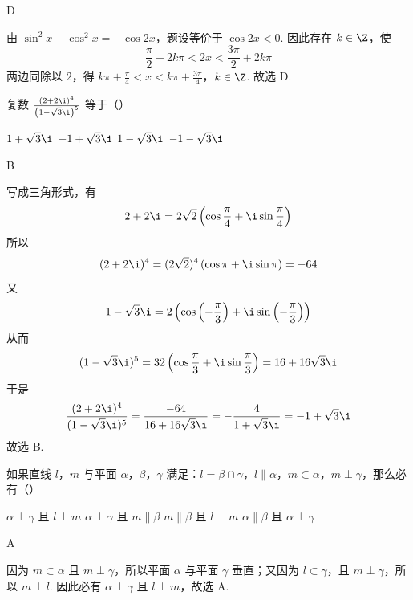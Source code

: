 \begin{answer}
D
\end{answer}

\begin{solution}
由 \(\sin^2x-\cos^2x=-\cos2x\)，题设等价于 \(\cos2x<0\). 因此存在 \(k\in\Z\)，使
\[
\frac{\pi}{2}+2k\pi<2x<\frac{3\pi}{2}+2k\pi
\]
两边同除以 \(2\)，得
\(k\pi+\frac{\pi}{4}<x<k\pi+\frac{3\pi}{4}\)，\(k\in\Z\).
故选 D.
\end{solution}

\begin{problem}
复数 \(\frac{(2 + 2\i)^4}{\left(1 - \sqrt{3}\i\right)^5}\) 等于（\quad）

\choices
    {\(1 + \sqrt{3}\i\)}
    {\(-1 + \sqrt{3}\i\)}
    {\(1 - \sqrt{3}\i\)}
    {\(-1 - \sqrt{3}\i\)}
\end{problem}

\begin{answer}
B
\end{answer}

\begin{solution}
写成三角形式，有
\[
2+2\i=2\sqrt2\left(\cos\frac{\pi}{4}+\i\sin\frac{\pi}{4}\right)
\]
所以
\[
(2+2\i)^4=(2\sqrt2)^4\left(\cos\pi+\i\sin\pi\right)=-64
\]
又
\[
1-\sqrt3\i=2\left(\cos\left(-\frac{\pi}{3}\right)+\i\sin\left(-\frac{\pi}{3}\right)\right)
\]
从而
\[
(1-\sqrt3\i)^5=32\left(\cos\frac{\pi}{3}+\i\sin\frac{\pi}{3}\right)=16+16\sqrt3\i
\]
于是
\[
\frac{(2+2\i)^4}{(1-\sqrt3\i)^5}=\frac{-64}{16+16\sqrt3\i}=-\frac{4}{1+\sqrt3\i}=-1+\sqrt3\i
\]
故选 B.
\end{solution}

\begin{problem}
如果直线 \(l\)，\(m\) 与平面 \(\alpha\)，\(\beta\)，\(\gamma\) 满足：\(l = \beta \cap \gamma\)，\(l \parallel \alpha\)，\(m \subset \alpha\)，\(m \perp \gamma\)，那么必有（\quad）

\choices
    {\(\alpha \perp \gamma\) 且 \(l \perp m\)}
    {\(\alpha \perp \gamma\) 且 \(m \parallel \beta\)}
    {\(m \parallel \beta\) 且 \(l \perp m\)}
    {\(\alpha \parallel \beta\) 且 \(\alpha \perp \gamma\)}
\end{problem}

\begin{answer}
A
\end{answer}

\begin{solution}
因为 \(m\subset\alpha\) 且 \(m\perp\gamma\)，所以平面 \(\alpha\) 与平面 \(\gamma\) 垂直；又因为 \(l\subset\gamma\)，且 \(m\perp\gamma\)，所以 \(m\perp l\). 因此必有 \(\alpha\perp\gamma\) 且 \(l\perp m\)，故选 A.
\end{solution}


